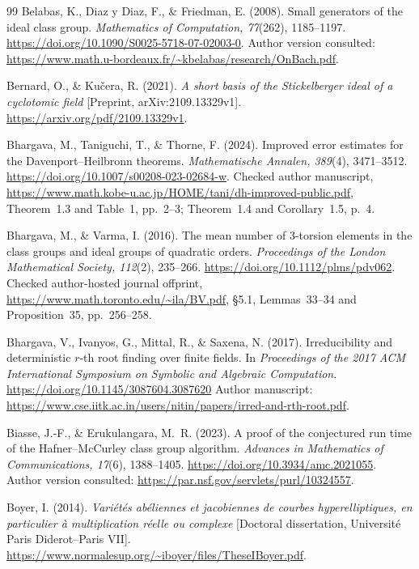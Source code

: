 \documentclass[11pt]{article}
\theoremstyle{definition}
\theoremstyle{remark}
\begin{document}
\begin{thebibliography}{99}
Belabas, K., Diaz y Diaz, F., \& Friedman, E. (2008).
Small generators of the ideal class group.
\emph{Mathematics of Computation, 77}(262), 1185--1197.
\url{https://doi.org/10.1090/S0025-5718-07-02003-0}.
Author version consulted: \url{https://www.math.u-bordeaux.fr/~kbelabas/research/OnBach.pdf}.

Bernard, O., \& Ku\v{c}era, R. (2021).
\emph{A short basis of the Stickelberger ideal of a cyclotomic field}
[Preprint, arXiv:2109.13329v1].
\url{https://arxiv.org/pdf/2109.13329v1}.

Bhargava, M., Taniguchi, T., \& Thorne, F. (2024).
Improved error estimates for the Davenport--Heilbronn theorems.
\emph{Mathematische Annalen, 389}(4), 3471--3512.
\url{https://doi.org/10.1007/s00208-023-02684-w}.
Checked author manuscript,
\url{https://www.math.kobe-u.ac.jp/HOME/tani/dh-improved-public.pdf},
Theorem~1.3 and Table~1, pp.~2--3; Theorem~1.4 and Corollary~1.5,
p.~4.

Bhargava, M., \& Varma, I. (2016).
The mean number of 3-torsion elements in the class groups and ideal
groups of quadratic orders.
\emph{Proceedings of the London Mathematical Society, 112}(2),
235--266.
\url{https://doi.org/10.1112/plms/pdv062}.
Checked author-hosted journal offprint,
\url{https://www.math.toronto.edu/~ila/BV.pdf},
\S5.1, Lemmas~33--34 and Proposition~35, pp.~256--258.

Bhargava, V., Ivanyos, G., Mittal, R., \& Saxena, N. (2017).
Irreducibility and deterministic $r$-th root finding over finite fields.
In \emph{Proceedings of the 2017 ACM International Symposium on Symbolic
and Algebraic Computation}.
\url{https://doi.org/10.1145/3087604.3087620}
Author manuscript:
\url{https://www.cse.iitk.ac.in/users/nitin/papers/irred-and-rth-root.pdf}.

Biasse, J.-F., \& Erukulangara, M.~R. (2023).
A proof of the conjectured run time of the Hafner--McCurley class group algorithm.
\emph{Advances in Mathematics of Communications, 17}(6), 1388--1405.
\url{https://doi.org/10.3934/amc.2021055}.
Author version consulted: \url{https://par.nsf.gov/servlets/purl/10324557}.

Boyer, I. (2014).
\emph{Vari\'et\'es ab\'eliennes et jacobiennes de courbes hyperelliptiques,
en particulier \`a multiplication r\'eelle ou complexe}
[Doctoral dissertation, Universit\'e Paris Diderot--Paris VII].
\url{https://www.normalesup.org/~iboyer/files/TheseIBoyer.pdf}.


\end{thebibliography}
\end{document}

